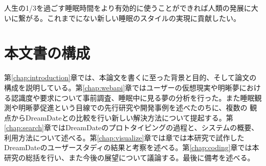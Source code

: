 人生の1/3を過ごす睡眠時間をより有効的に使うことができれば人類の発展に大いに繋がる。これまでにない新しい睡眠のスタイルの実現に貢献したい。

\section{本文書の構成}
第\ref{chap:introduction}章では、本論文を書くに至った背景と目的、そして論文の構成を説明している。第\ref{chap:webapi}章ではユーザーの仮想現実や明晰夢における認識度や要求について事前調査、睡眠中に見る夢の分析を行った。また睡眠観測や明晰夢促進という目線での先行研究や開発事例を述べたのちに、複数の 観点からDreamDateとの比較を行い新しい解決方法について提起する。第\ref{chap:search}章ではDreamDateのプロトタイピングの過程と、システムの概要、利用方法について述べる。第\ref{chap:visualize}章では章では本研究で試作した DreamDateのユーザースタディの結果と考察を述べる。第\ref{chap:coding}章では本研究の総括を行い、また今後の展望について議論する。最後に備考を述べる。
